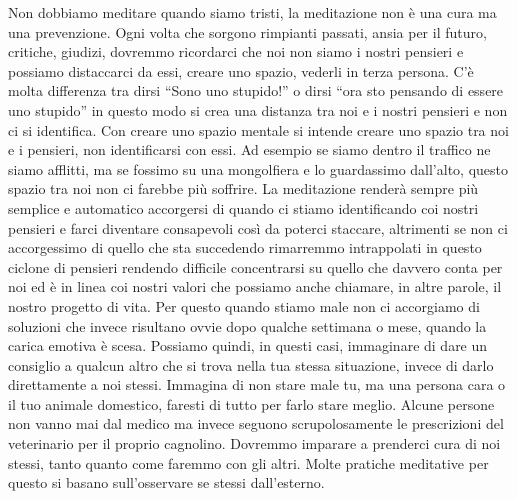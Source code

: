 \documentclass[12pt]{book} %
\begin{document}
Non dobbiamo meditare quando siamo tristi, la meditazione non è una cura ma una prevenzione. Ogni volta che sorgono
rimpianti passati, ansia per il futuro, critiche, giudizi, dovremmo ricordarci che noi non siamo i nostri pensieri e
possiamo distaccarci da essi, creare uno spazio, vederli in terza persona. C'è molta differenza
tra dirsi “Sono uno stupido!” o dirsi “ora sto pensando di essere uno stupido” in questo modo si crea una distanza tra
noi e i nostri pensieri e non ci si identifica. Con creare uno spazio mentale si intende creare uno spazio tra noi e i
pensieri, non identificarsi con essi. Ad esempio se siamo dentro il traffico ne siamo afflitti, ma se fossimo su una
mongolfiera e lo guardassimo dall'alto, questo spazio tra noi non ci farebbe più soffrire. La
meditazione renderà sempre più semplice e automatico accorgersi di quando ci stiamo identificando coi nostri pensieri e
farci diventare consapevoli così da poterci staccare, altrimenti se non ci accorgessimo di quello che sta succedendo
rimarremmo intrappolati in questo ciclone di pensieri rendendo difficile concentrarsi su quello che davvero conta per
noi ed è in linea coi nostri valori che possiamo anche chiamare, in altre parole, il nostro progetto di vita. Per
questo quando stiamo male non ci accorgiamo di soluzioni che invece risultano ovvie dopo qualche settimana o mese,
quando la carica emotiva è scesa. Possiamo quindi, in questi casi, immaginare di dare un consiglio a qualcun altro che
si trova nella tua stessa situazione, invece di darlo direttamente a noi stessi. Immagina di non stare male tu, ma una
persona cara o il tuo animale domestico, faresti di tutto per farlo stare meglio. Alcune persone non vanno mai dal
medico ma invece seguono scrupolosamente le prescrizioni del veterinario per il proprio cagnolino. Dovremmo imparare a
prenderci cura di noi stessi, tanto quanto come faremmo con gli altri. Molte pratiche meditative per questo si basano
sull'osservare se stessi dall'esterno.
\end{document}
